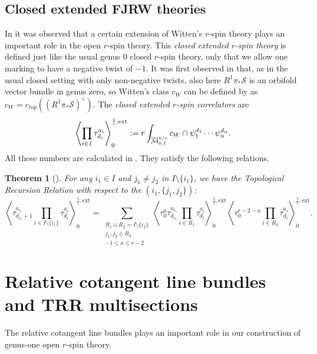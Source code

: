 \documentclass[11pt]{amsart}
\newtheorem{thm}[dummy]{Theorem}
\theoremstyle{definition}
\theoremstyle{remark}
\newcommand{\<}{\left<}
\renewcommand{\>}{\right>}
\numberwithin{equation}{section}
\def\Mbar{{\overline{\mathcal M}}}
\begin{document}
\subsection{Closed extended FJRW theories}\label{subsec:closed_ext_r_m}
In \cite{BCT_Closed_Extended,BCT2} it was observed that a certain extension of Witten's $r$-spin theory plays an important role in the open $r$-spin theory. This \emph{closed extended $r$-spin theory} is defined just like the usual genus $0$ closed $r$-spin theory, only that we allow one marking to have a negative twist of $-1.$ It was first observed in \cite{JKV2} that, as in the usual closed setting with only non-negative twists, also here $R^1\pi_*\mathcal{S}$ is an orbifold vector bundle in genus zero, so Witten's class $c_W$ can be defined by as $c_W=c_{top}((R^1\pi_*\mathcal{S})^\vee)$. The \textit{closed extended $r$-spin correlators} are
\begin{equation}\label{eq:define closed ext}
\left\langle\prod_{i\in I}\tau^{a_i}_{d_i}\right\rangle^{\frac{1}{r},\text{ext}}_0:=r\int_{\Mbar^{1/r}_{0,I}} \hspace{-0cm} c_W \cap \psi_1^{d_1} \cdots \psi_n^{d_n}.
\end{equation}
 All these numbers are calculated in \cite{BCT_Closed_Extended}. They satisfy the following relations.
 \begin{thm}[{\cite[Lemma 3.6]{BCT_Closed_Extended}}] \label{thm trr closed extended}  
 For any $i_1\in I$ and $j_1\ne j_2$ in $I\setminus \{i_1\}$, we have the Topological Recursion Relation with respect to the $(i_1,\{j_1,j_2\})$:
\begin{equation}\label{eq trr closed extended}
    \left\langle\tau^{a_{i_1}}_{d_{i_1}+1}\prod_{i\in I\setminus \{i_1\}}\tau^{a_i}_{d_i}\right\rangle^{\frac{1}{r},\text{ext}}_0=
    \sum_{\substack{R_1\sqcup R_2=I\setminus\{i_1\}\\j_1,j_2\in R_2\\-1 \le a \le r-2}} 
    \left\langle\tau^a_0 \tau^{a_{i_1}}_{d_{i_1}} \prod_{i\in R_1}\tau^{a_i}_{d_i}\right\rangle^{\frac{1}{r},\text{ext}}_0 
    \left\langle\tau^{r-2-a}_0\prod_{i\in R_2}\tau^{a_i}_{d_i}\right\rangle^{\frac{1}{r},\text{ext}}_0.
\end{equation}
     
 \end{thm}


\section{Relative cotangent line bundles and TRR multisections}\label{sec relative  cotangent and all}
The relative cotangent line bundles plays an important role in our construction of genus-one open $r$-spin theory.
\end{document}
